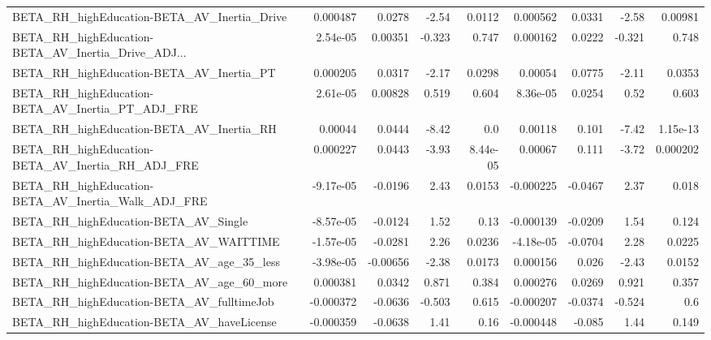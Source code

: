 \begin{tabular}{lrrrrrrrr}
BETA\_RH\_highEducation-BETA\_AV\_Inertia\_Drive        &    0.000487 &       0.0278 &    -2.54 &   0.0112 &   0.000562 &      0.0331 &        -2.58 &       0.00981 \\
BETA\_RH\_highEducation-BETA\_AV\_Inertia\_Drive\_ADJ... &    2.54e-05 &      0.00351 &   -0.323 &    0.747 &   0.000162 &      0.0222 &       -0.321 &         0.748 \\
BETA\_RH\_highEducation-BETA\_AV\_Inertia\_PT           &    0.000205 &       0.0317 &    -2.17 &   0.0298 &    0.00054 &      0.0775 &        -2.11 &        0.0353 \\
BETA\_RH\_highEducation-BETA\_AV\_Inertia\_PT\_ADJ\_FRE   &    2.61e-05 &      0.00828 &    0.519 &    0.604 &   8.36e-05 &      0.0254 &         0.52 &         0.603 \\
BETA\_RH\_highEducation-BETA\_AV\_Inertia\_RH           &     0.00044 &       0.0444 &    -8.42 &      0.0 &    0.00118 &       0.101 &        -7.42 &      1.15e-13 \\
BETA\_RH\_highEducation-BETA\_AV\_Inertia\_RH\_ADJ\_FRE   &    0.000227 &       0.0443 &    -3.93 & 8.44e-05 &    0.00067 &       0.111 &        -3.72 &      0.000202 \\
BETA\_RH\_highEducation-BETA\_AV\_Inertia\_Walk\_ADJ\_FRE &   -9.17e-05 &      -0.0196 &     2.43 &   0.0153 &  -0.000225 &     -0.0467 &         2.37 &         0.018 \\
BETA\_RH\_highEducation-BETA\_AV\_Single               &   -8.57e-05 &      -0.0124 &     1.52 &     0.13 &  -0.000139 &     -0.0209 &         1.54 &         0.124 \\
BETA\_RH\_highEducation-BETA\_AV\_WAITTIME             &   -1.57e-05 &      -0.0281 &     2.26 &   0.0236 &  -4.18e-05 &     -0.0704 &         2.28 &        0.0225 \\
BETA\_RH\_highEducation-BETA\_AV\_age\_35\_less          &   -3.98e-05 &     -0.00656 &    -2.38 &   0.0173 &   0.000156 &       0.026 &        -2.43 &        0.0152 \\
BETA\_RH\_highEducation-BETA\_AV\_age\_60\_more          &    0.000381 &       0.0342 &    0.871 &    0.384 &   0.000276 &      0.0269 &        0.921 &         0.357 \\
BETA\_RH\_highEducation-BETA\_AV\_fulltimeJob          &   -0.000372 &      -0.0636 &   -0.503 &    0.615 &  -0.000207 &     -0.0374 &       -0.524 &           0.6 \\
BETA\_RH\_highEducation-BETA\_AV\_haveLicense          &   -0.000359 &      -0.0638 &     1.41 &     0.16 &  -0.000448 &      -0.085 &         1.44 &         0.149 \\

\end{tabular}
